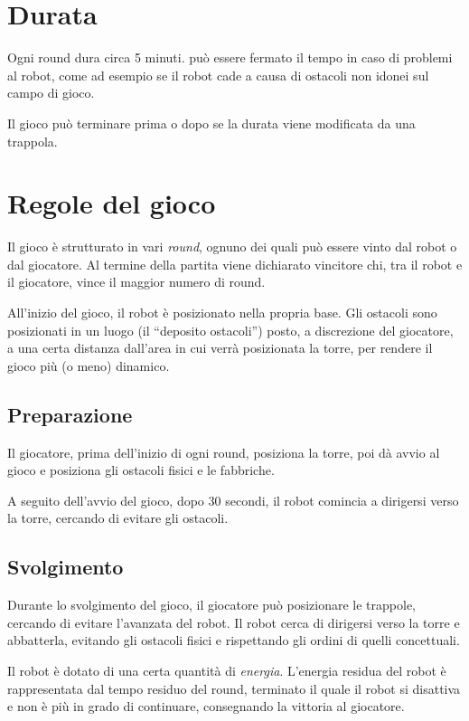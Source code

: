 \section{Durata} 
Ogni round dura circa 5 minuti. può essere fermato il tempo in caso di problemi al robot, come ad esempio se il robot cade a causa di ostacoli non idonei sul campo di gioco.

Il gioco può terminare prima o dopo se la durata viene modificata da una trappola.

\section{Regole del gioco} 
Il gioco è strutturato in vari \emph{round}, ognuno dei quali può essere vinto dal robot o dal giocatore. Al termine della partita viene dichiarato vincitore chi, tra il robot e il giocatore, vince il maggior numero di round.

All'inizio del gioco, il robot è posizionato nella propria base. Gli ostacoli sono posizionati in un luogo (il ``deposito ostacoli'') posto, a discrezione del giocatore, a una certa distanza dall'area in cui verrà posizionata la torre, per rendere il gioco più (o meno) dinamico.


	\subsection*{Preparazione}
Il giocatore, prima dell'inizio di ogni round, posiziona la torre, poi dà avvio al gioco e posiziona gli ostacoli fisici e le fabbriche.

A seguito dell'avvio del gioco, dopo 30 secondi, il robot comincia a dirigersi verso la torre, cercando di evitare gli ostacoli.
	
	\subsection*{Svolgimento}
	Durante lo svolgimento del gioco, il giocatore può posizionare le trappole, cercando di evitare l'avanzata del robot. Il robot cerca di dirigersi verso la torre e abbatterla, evitando gli ostacoli fisici e rispettando gli ordini di quelli concettuali.

Il robot è dotato di una certa quantità di \emph{energia}. L'energia residua del robot è rappresentata dal tempo residuo del round, terminato il quale il robot si disattiva e non è più in grado di continuare, consegnando la vittoria al giocatore.


